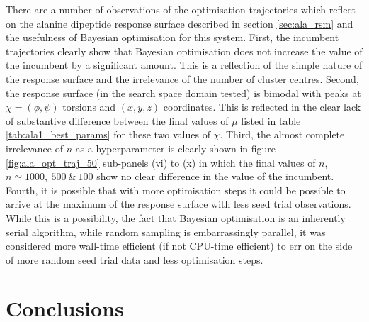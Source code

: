 There are a number of observations of the optimisation trajectories which reflect on the alanine dipeptide response surface described in section \ref{sec:ala_rsm} and the usefulness of Bayesian optimisation for this system. First, the incumbent trajectories clearly show that Bayesian optimisation does not increase the value of the incumbent by a significant amount. This is a reflection of the simple nature of the response surface and the irrelevance of the number of cluster centres. Second, the response surface (in the search space domain tested) is bimodal with peaks at $\chi=(\phi, \psi)$ torsions and $(x, y, z)$ coordinates. This is reflected in the clear lack of substantive difference between the final values of $\mu$ listed in table \ref{tab:ala1_best_params} for these two values of $\chi$.  Third, the almost complete irrelevance of $n$ as a hyperparameter is clearly shown in figure \ref{fig:ala_opt_traj_50} sub-panels (vi) to (x) in which the final values of $n$, $n \simeq 1000,\ 500\ \&\ 100$ show no clear difference in the value of the incumbent. Fourth, it is possible that with more optimisation steps it could be possible to arrive at the maximum of the response surface with less seed trial observations. While this is a possibility, the fact that Bayesian optimisation is an inherently serial algorithm, while random sampling is embarrassingly parallel, it was considered more wall-time efficient (if not CPU-time efficient) to err on the side of more random seed trial data and less optimisation steps. 

\section{Conclusions}\label{sec:msm_conc}

